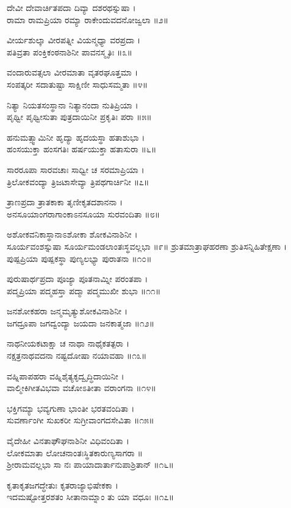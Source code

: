 ದೇವೀ ದೇವಾರ್ಚಿತಪದಾ ದಿವ್ಯಾ ದಶರಥಸ್ನುಷಾ ।\\
ರಾಮಾ ರಾಮಪ್ರಿಯಾ ರಮ್ಯಾ ರಾಕೇಂದುವದನೋಜ್ವಲಾ ॥೨॥

ವೀರ್ಯಶುಲ್ಕಾ ವೀರಪತ್ನೀ ವಿಯನ್ಮಧ್ಯಾ ವರಪ್ರದಾ ।\\
ಪತಿವ್ರತಾ ಪಂಕ್ತಿಕಂಠನಾಶಿನೀ ಪಾವನಸ್ಮೃತಿಃ ॥೩॥

ವಂದಾರುವತ್ಸಲಾ ವೀರಮಾತಾ ವೃತರಘೂತ್ತಮಾ ।\\
ಸಂಪತ್ಕರೀ ಸದಾತುಷ್ಟಾ ಸಾಕ್ಷಿಣೀ ಸಾಧುಸಮ್ಮತಾ ॥೪॥

ನಿತ್ಯಾ ನಿಯತಸಂಸ್ಥಾನಾ ನಿತ್ಯಾನಂದಾ ನುತಿಪ್ರಿಯಾ ।\\
ಪೃಥ್ವೀ ಪೃಥ್ವೀಸುತಾ ಪುತ್ರದಾಯಿನೀ ಪ್ರಕೃತಿಃ ಪರಾ ॥೫॥

ಹನುಮತ್ಸ್ವಾಮಿನೀ ಹೃದ್ಯಾ ಹೃದಯಸ್ಥಾ ಹತಾಶುಭಾ ।\\
ಹಂಸಯುಕ್ತಾ ಹಂಸಗತಿಃ ಹರ್ಷಯುಕ್ತಾ ಹತಾಸುರಾ ॥೬॥

ಸಾರರೂಪಾ ಸಾರವಚಾಃ ಸಾಧ್ವೀ ಚ ಸರಮಾಪ್ರಿಯಾ ।\\
ತ್ರಿಲೋಕವಂದ್ಯಾ ತ್ರಿಜಟಾಸೇವ್ಯಾ ತ್ರಿಪಥಗಾರ್ಚಿನೀ ॥೭॥

ತ್ರಾಣಪ್ರದಾ ತ್ರಾತಕಾಕಾ ತೃಣೀಕೃತದಶಾನನಾ ।\\
ಅನಸೂಯಾಂಗರಾಗಾಂಕಾಽನಸೂಯಾ ಸುರವಂದಿತಾ ॥೮॥

ಅಶೋಕವನಿಕಾಸ್ಥಾನಾಽಶೋಕಾ ಶೋಕವಿನಾಶಿನೀ ।\\
ಸೂರ್ಯವಂಶಸ್ನುಷಾ ಸೂರ್ಯಮಂಡಲಾಂತಃಸ್ಥವಲ್ಲಭಾ ॥೯॥
\newpage
ಶ್ರುತಮಾತ್ರಾಘಹರಣಾ ಶ್ರುತಿಸನ್ನಿಹಿತೇಕ್ಷಣಾ ।\\
ಪುಷ್ಪಪ್ರಿಯಾ ಪುಷ್ಪಕಸ್ಥಾ ಪುಣ್ಯಲಭ್ಯಾ ಪುರಾತನಾ ॥೧೦॥

ಪುರುಷಾರ್ಥಪ್ರದಾ ಪೂಜ್ಯಾ ಪೂತನಾಮ್ನೀ ಪರಂತಪಾ ।\\
ಪದ್ಮಪ್ರಿಯಾ ಪದ್ಮಹಸ್ತಾ ಪದ್ಮಾ ಪದ್ಮಮುಖೀ ಶುಭಾ ॥೧೧॥

ಜನಶೋಕಹರಾ ಜನ್ಮಮೃತ್ಯುಶೋಕವಿನಾಶಿನೀ ।\\
ಜಗದ್ರೂಪಾ ಜಗದ್ವಂದ್ಯಾ ಜಯದಾ ಜನಕಾತ್ಮಜಾ ॥೧೨॥

ನಾಥನೀಯಕಟಾಕ್ಷಾ ಚ ನಾಥಾ ನಾಥೈಕತತ್ಪರಾ ।\\
ನಕ್ಷತ್ರನಾಥವದನಾ ನಷ್ಟದೋಷಾ ನಯಾವಹಾ ॥೧೩॥

ವಹ್ನಿಪಾಪಹರಾ ವಹ್ನಿಶೈತ್ಯಕೃದ್ವೃದ್ಧಿದಾಯಿನೀ ।\\
ವಾಲ್ಮೀಕಿಗೀತವಿಭವಾ ವಚೋಽತೀತಾ ವರಾಂಗನಾ ॥೧೪॥

ಭಕ್ತಿಗಮ್ಯಾ ಭವ್ಯಗುಣಾ ಭಾಂತೀ ಭರತವಂದಿತಾ ।\\
ಸುವರ್ಣಾಂಗೀ ಸುಖಕರೀ ಸುಗ್ರೀವಾಂಗದಸೇವಿತಾ ॥೧೫॥

ವೈದೇಹೀ ವಿನತಾಘೌಘನಾಶಿನೀ ವಿಧಿವಂದಿತಾ ।\\
ಲೋಕಮಾತಾ ಲೋಚನಾಂತಃಸ್ಥಿತಕಾರುಣ್ಯಸಾಗರಾ ॥\\
ಶ್ರೀರಾಮವಲ್ಲಭಾ ಸಾ ನಃ ಪಾಯಾದಾರ್ತಾನುಪಾಶ್ರಿತಾನ್ ॥೧೬॥

ಕೃತಾಕೃತಜಗದ್ಧೇತುಃ ಕೃತರಾಜ್ಯಾಭಿಷೇಕಕಾ ।\\
ಇದಮಷ್ಟೋತ್ತರಶತಂ ಸೀತಾನಾಮ್ನಾಂ ತು ಯಾ ವಧೂಃ ॥೧೭॥

